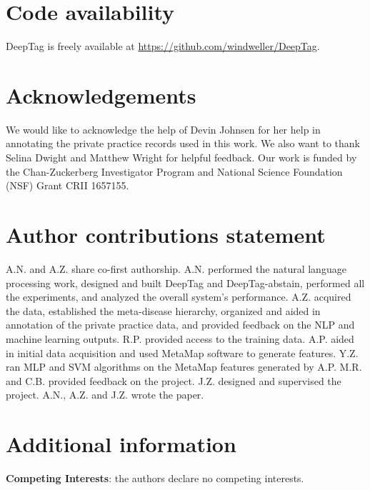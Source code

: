 \documentclass{article}[11pt,oneside]
\begin{document}
\section*{Code availability}
DeepTag is freely available at \url{https://github.com/windweller/DeepTag}.

\section*{Acknowledgements}

We would like to acknowledge the help of Devin Johnsen for her help in annotating the private practice records used in this work. We also want to thank Selina Dwight and Matthew Wright for helpful feedback. 
Our work is funded by the Chan-Zuckerberg Investigator Program and  National Science Foundation (NSF) Grant CRII 1657155.

\section*{Author contributions statement}

A.N. and A.Z. share co-first authorship. A.N. performed the natural language processing work, designed and built DeepTag and DeepTag-abstain, performed all the experiments, and analyzed the overall system's performance.  A.Z. acquired the data, established the meta-disease hierarchy, organized and aided in annotation of the private practice data, and provided feedback on the NLP and machine learning outputs. R.P. provided access to the training data. A.P. aided in initial data acquisition and used MetaMap software to generate features. Y.Z. ran MLP and SVM algorithms on the MetaMap features generated by A.P. M.R. and C.B. provided feedback on the project. J.Z. designed and supervised the project. A.N., A.Z. and J.Z. wrote the paper.

\section*{Additional information}
\textbf{Competing Interests}: the authors declare no competing interests.
\end{document}
